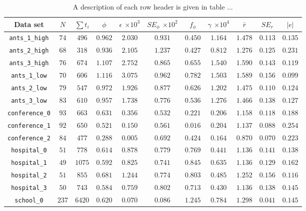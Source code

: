\documentclass[10pt]{article}
\begin{document}
\begin{multicols}{2}
\begin{table*}[t]
\caption{A description of each row header is given in table ...}
\label{results}
\centering
\begin{tabular}{c|cccccccccc}
\toprule
Data set & $N$  & $\sum t_{i}$ & $\phi$ & $\epsilon$ \small{$\times 10^{3}$} & $SE_{\phi}$ \small{$\times 10^{2}$} & $f_{\phi}$ & $\gamma $ \small{$\times 10^{4}$} & $\bar{r}$ & $SE_{r}$ & $|e|$\\
\midrule
\verb|ants_1_high| & $74$ & $496$ & $0.962$ & $2.030$ & $0.931$ & $0.450$ & $1.164$ & $1.478$ & $0.113$ & $0.135$\\
\verb|ants_2_high| & $68$ & $318$ & $0.936$ & $2.105$ & $1.237$ & $0.427$ & $0.812$ & $1.276$ & $0.125$ & $0.231$\\
\verb|ants_3_high| & $76$ & $674$ & $1.107$ & $2.752$ & $0.865$ & $0.655$ & $1.540$ & $1.590$ & $0.143$ & $0.119$\\
\verb|ants_1_low| & $70$ & $606$ & $1.116$ & $3.075$ & $0.962$ & $0.782$ & $1.503$ & $1.589$ & $0.156$ & $0.099$\\
\verb|ants_2_low| & $79$ & $547$ & $0.972$ & $1.926$ & $0.877$ & $0.626$ & $1.202$ & $1.475$ & $0.110$ & $0.124$\\
\verb|ants_3_low| & $83$ & $610$ & $0.957$ & $1.738$ & $0.776$ & $0.536$ & $1.276$ & $1.466$ & $0.138$ & $0.127$\\
\verb|conference_0| & $93$ & $663$ & $0.631$ & $0.356$ & $0.532$ & $0.221$ & $0.206$ & $1.158$ & $0.118$ & $0.188$\\
\verb|conference_1| & $92$ & $650$ & $0.521$ & $0.150$ & $0.561$ & $0.016$ & $0.204$ & $1.137$ & $0.088$ & $0.254$\\
\verb|conference_2| & $84$ & $477$ & $0.288$ & $0.005$ & $0.692$ & $0.424$ & $0.164$ & $0.870$ & $0.070$ & $0.223$\\
\verb|hospital_0| & $51$ & $778$ & $0.614$ & $0.878$ & $0.779$ & $0.769$ & $0.441$ & $1.136$ & $0.141$ & $0.138$\\
\verb|hospital_1| & $49$ & $1075$ & $0.592$ & $0.825$ & $0.741$ & $0.845$ & $0.635$ & $1.136$ & $0.129$ & $0.162$\\
\verb|hospital_2| & $51$ & $855$ & $0.681$ & $1.244$ & $0.774$ & $0.803$ & $0.485$ & $1.252$ & $0.156$ & $0.116$\\
\verb|hospital_3| & $50$ & $743$ & $0.584$ & $0.759$ & $0.802$ & $0.713$ & $0.430$ & $1.136$ & $0.138$ & $0.145$\\
\verb|school_0| & $237$ & $6420$ & $0.620$ & $0.070$ & $0.086$ & $1.245$ & $0.784$ & $1.298$ & $0.041$ & $0.145$\\

\end{tabular}
\end{table*}
\end{multicols}
\end{document}
